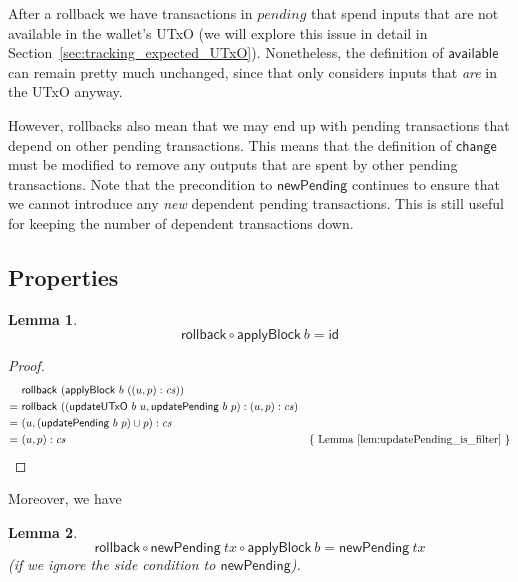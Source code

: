 \documentclass{article}
\newtheorem{lemma}{Lemma}[section] %
\numberwithin{equation}{lemma}
\begin{document}
After a rollback we have transactions in $\mathit{pending}$ that spend inputs
that are not available in the wallet's UTxO (we will explore this issue in detail in
Section~\ref{sec:tracking_expected_UTxO}). Nonetheless, the definition of $\mathsf{available}$ can
remain pretty much unchanged, since that only considers inputs that \emph{are}
in the UTxO anyway.

However, rollbacks also mean that we may end up with pending transactions that
depend on other pending transactions. This means that the definition of
$\mathsf{change}$ must be modified to remove any outputs that are spent by other
pending transactions. Note that the precondition to $\mathsf{newPending}$
continues to ensure that we cannot introduce any \emph{new} dependent pending
transactions. This is still useful for keeping the number of dependent
transactions down.

\subsection{Properties}

\begin{lemma} \label{lem:rollback_applyBlock_id}
\begin{equation*}
\mathsf{rollback} \circ \mathsf{applyBlock} ~ b = \mathsf{id}
\end{equation*}
\end{lemma}

\begin{proof}
\begin{align*}
    & \mathsf{rollback} ~ (\mathsf{applyBlock} ~ b ~ ((u, p) : \mathit{cs})) \\
= ~ & \mathsf{rollback} ~ (( \mathsf{updateUTxO} ~ b ~ u
         , \mathsf{updatePending} ~ b ~ p
         )
         : (u, p) : \mathit{cs}
         ) \\
= ~ & (u, (\mathsf{updatePending} ~ b ~ p) \cup p) : \mathit{cs} \\
= ~ & (u, p) : \mathit{cs} & \text{\{ Lemma~\ref{lem:updatePending_is_filter} \}}
\end{align*}
\end{proof}

Moreover, we have

\begin{lemma}
\begin{equation*}
\mathsf{rollback} \circ \mathsf{newPending} ~ tx \circ \mathsf{applyBlock} ~ b
= \mathsf{newPending} ~ tx
\end{equation*}
(if we ignore the side condition to $\mathsf{newPending}$).
\end{lemma}
\end{document}
